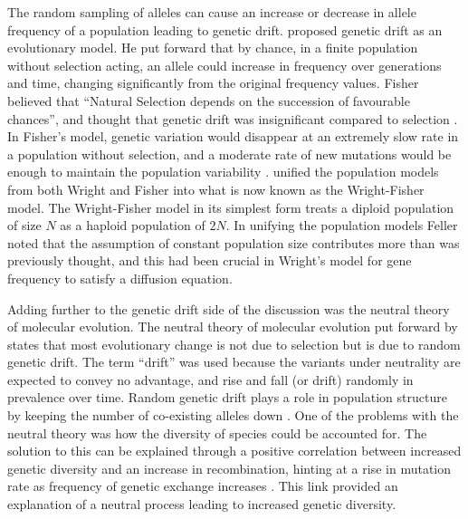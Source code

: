 \documentclass[twoside,openright]{report}
\begin{document}
The random sampling of alleles can cause an increase or decrease in
allele frequency of a population leading to genetic drift.
\citet{Wright1931} proposed genetic drift as an evolutionary model. He
put forward that by chance, in a finite population without selection
acting, an allele could increase in frequency over generations and time,
changing significantly from the original frequency values. Fisher
believed that ``Natural Selection depends on the succession of
favourable chances'', and thought that genetic drift was insignificant
compared to selection \citep{Fisher1930}. In Fisher's model, genetic
variation would disappear at an extremely slow rate in a population
without selection, and a moderate rate of new mutations would be enough
to maintain the population variability \citep{Fisher1922}.
\citet{Feller1951} unified the population models from both Wright and
Fisher into what is now known as the Wright-Fisher model. The
Wright-Fisher model in its simplest form treats a diploid population of
size \(N\) as a haploid population of \(2N\). In unifying the population
models Feller noted that the assumption of constant population size
contributes more than was previously thought, and this had been crucial
in Wright's model for gene frequency to satisfy a diffusion equation.

Adding further to the genetic drift side of the discussion was the
neutral theory of molecular evolution. The neutral theory of molecular
evolution put forward by \citet{Kimura1979a} states that most
evolutionary change is not due to selection but is due to random genetic
drift. The term ``drift'' was used because the variants under neutrality
are expected to convey no advantage, and rise and fall (or drift)
randomly in prevalence over time. Random genetic drift plays a role in
population structure by keeping the number of co-existing alleles down
\citep{Kimura1955}. One of the problems with the neutral theory was how
the diversity of species could be accounted for. The solution to this
can be explained through a positive correlation between increased
genetic diversity and an increase in recombination, hinting at a rise in
mutation rate as frequency of genetic exchange increases
\citep{Hellmann2003}. This link provided an explanation of a neutral
process leading to increased genetic diversity.
\end{document}
